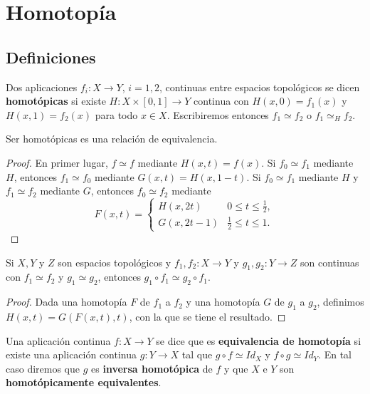 \documentclass[CV.tex]{subfiles}
\begin{document}

\chapter{Homotopía}

\section{Definiciones}

\begin{defi}
Dos aplicaciones $f_i:X\to Y$, $i=1,2$, continuas entre espacios topológicos se dicen \textbf{homotópicas} si existe $H:X\times [0,1]\to Y$ continua con $H(x,0)=f_1(x)$ y $H(x,1)=f_2(x)$ para todo $x\in X$. Escribiremos entonces $f_1\simeq f_2$ o $f_1\simeq_H f_2$.
\end{defi}

\begin{lemma}
Ser homotópicas es una relación de equivalencia.
\end{lemma}
\begin{proof}
En primer lugar, $f\simeq f$ mediante $H(x,t)=f(x)$. Si $f_0\simeq f_1$ mediante $H$, entonces $f_1\simeq f_0$ mediante $G(x,t)=H(x,1-t)$. Si $f_0\simeq f_1$ mediante $H$ y $f_1\simeq f_2$ mediante $G$, entonces $f_0\simeq f_2$ mediante
\[
F(x,t)=\begin{cases}
H(x,2t) & 0\leq t\leq\frac{1}{2},\\
G(x,2t-1) & \frac{1}{2}\leq t\leq 1.
\end{cases}
\]
\end{proof}

\begin{lemma}
Si $X,Y$ y $Z$ son espacios topológicos y $f_1,f_2:X\to Y$ y $g_1,g_2:Y\to Z$ son continuas con $f_1\simeq f_2$ y $g_1\simeq g_2$, entonces $g_1\circ f_1\simeq g_2\circ f_1$. 
\end{lemma}
\begin{proof}
Dada una homotopía $F$ de $f_1$ a $f_2$ y una homotopía $G$ de $g_1$ a $g_2$, definimos $H(x,t)=G(F(x,t),t)$, con la que se tiene el resultado.
\end{proof}

%

\begin{defi}
Una aplicación continua $f:X\to Y$ se dice que es \textbf{equivalencia de homotopía} si existe una aplicación continua $g:Y\to X$ tal que $g\circ f\simeq Id_X$ y $f\circ g\simeq Id_Y$. En tal caso diremos que $g$ es \textbf{inversa homotópica} de $f$ y que $X$ e $Y$ son \textbf{homotópicamente equivalentes}.
\end{defi}
\end{document}
